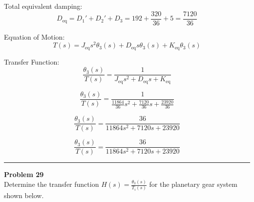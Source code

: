 Total equivalent damping:
\[
D_{\text{eq}} = D_1' + D_2' + D_3 = 192 + \frac{320}{36} + 5 = \frac{7120}{36}
\]

Equation of Motion:
\[
T(s) = J_{\text{eq}} s^2 \theta_3(s) + D_{\text{eq}} s \theta_3(s) + K_{\text{eq}} \theta_3(s)
\]

Transfer Function:
\[
\frac{\theta_3(s)}{T(s)} = \frac{1}{J_{\text{eq}} s^2 + D_{\text{eq}} s + K_{\text{eq}}}
\]

\[
\frac{\theta_3(s)}{T(s)} = \frac{1}{\frac{11864}{36} s^2 + \frac{7120}{36} s + \frac{23920}{36}}
\]

\[
\frac{\theta_3(s)}{T(s)} = \frac{36}{11864 s^2 + 7120 s + 23920}
\]

\[
\boxed{\frac{\theta_3(s)}{T(s)} = \frac{36}{11864 s^2 + 7120 s + 23920}}
\]

\newpage

\noindent\rule{\textwidth}{1pt}
\noindent\textbf{Problem 29} \hfill
\\ Determine the transfer function \(H(s) = \frac{\theta_3(s)}{T_i(s)}\) for the planetary gear system shown below.

